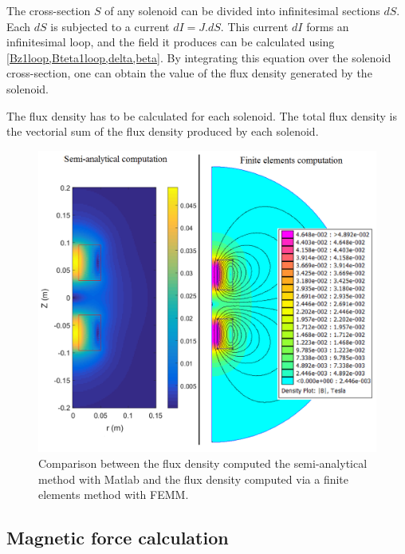 \documentclass[letterpaper, 10 pt, conference]{ieeeconf}  %
\begin{document}
The cross-section $S$ of any solenoid can be divided into infinitesimal sections $dS$. Each $dS$ is subjected to a current $dI=J.dS$. This current $dI$ forms an infinitesimal loop, and the field it produces can be calculated using \cref{Bz1loop,Bteta1loop,delta,beta}. By integrating this equation over the solenoid cross-section, one can obtain the value of the flux density generated by the solenoid.\par
The flux density has to be calculated for each solenoid. The total flux density is the vectorial sum of the flux density produced by each solenoid.

\begin{figure}
  \includegraphics[width=\linewidth]{Femm_matlab_comparison.png}
  \caption{Comparison between the flux density computed the semi-analytical method with Matlab and the flux density computed via a finite elements method with FEMM.}
  \label{Femm_matlab_comparison}
\end{figure}

\subsection{Magnetic force calculation}
\end{document}
